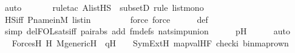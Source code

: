 \begin{isabellebody}
\ auto{\isacharbrackleft}{\kern0pt}{}{\isacharbrackright}{\kern0pt}\isanewline
\ \ \ \ \ \ \isamarkupfalse%
{\isacharparenleft}{\kern0pt}rule{\isacharunderscore}{\kern0pt}tac\ A{\isacharequal}{\kern0pt}{\isachardoublequoteopen}list{\isacharparenleft}{\kern0pt}HS{\isacharparenright}{\kern0pt}{\isachardoublequoteclose}\ \ subsetD{\isacharcomma}{\kern0pt}\ rule\ list{\isacharunderscore}{\kern0pt}mono{\isacharparenright}{\kern0pt}\isanewline
\ \ \ \ \isamarkupfalse%
\ HS{\isacharunderscore}{\kern0pt}iff\ P{\isacharunderscore}{\kern0pt}name{\isacharunderscore}{\kern0pt}in{\isacharunderscore}{\kern0pt}M\ listin{\isacharprime}{\kern0pt}{\isacharprime}{\kern0pt}\isanewline
\ \ \ \ \ \ \ \isamarkupfalse%
\ {\isacharparenleft}{\kern0pt}force{\isacharcomma}{\kern0pt}\ force{\isacharparenright}{\kern0pt}\isanewline
\ \ \ \ \isamarkupfalse%
\ {\isasymphi}{\isacharunderscore}{\kern0pt}def\isanewline
\ \ \ \ \ \isamarkupfalse%
\ {\isacharparenleft}{\kern0pt}simp\ del{\isacharcolon}{\kern0pt}FOL{\isacharunderscore}{\kern0pt}sats{\isacharunderscore}{\kern0pt}iff\ pair{\isacharunderscore}{\kern0pt}abs\ add{\isacharcolon}{\kern0pt}\ fm{\isacharunderscore}{\kern0pt}defs\ nat{\isacharunderscore}{\kern0pt}simp{\isacharunderscore}{\kern0pt}union{\isacharparenright}{\kern0pt}\isanewline
\ \ \ \ \isamarkupfalse%
\ pH\isanewline
\ \ \ \ \isamarkupfalse%
\ auto\isanewline
\ \ \isamarkupfalse%
\ \isamarkupfalse%
\ ForcesH{}{\isacharcolon}{\kern0pt}\ {\isachardoublequoteopen}{\isacharparenleft}{\kern0pt}{\isasymforall}H{\isachardot}{\kern0pt}\ M{\isacharunderscore}{\kern0pt}generic{\isacharparenleft}{\kern0pt}H{\isacharparenright}{\kern0pt}\ {\isasymand}\ q{\isasymin}H\ \ {\isasymlongrightarrow}\ \ SymExt{\isacharparenleft}{\kern0pt}H{\isacharparenright}{\kern0pt}{\isacharcomma}{\kern0pt}\ map{\isacharparenleft}{\kern0pt}val{\isacharparenleft}{\kern0pt}H{\isacharparenright}{\kern0pt}{\isacharcomma}{\kern0pt}{\isacharbrackleft}{\kern0pt}F{\isacharprime}{\kern0pt}{\isacharcomma}{\kern0pt}\ check{\isacharparenleft}{\kern0pt}i{\isacharparenright}{\kern0pt}{\isacharcomma}{\kern0pt}\ binmap{\isacharunderscore}{\kern0pt}row{\isacharprime}{\kern0pt}{\isacharparenleft}{\kern0pt}n{\isacharparenright}{\kern0pt}{\isacharbrackright}{\kern0pt}{\isacharparenright}{\kern0pt}\ {\isasymTurnstile}\ {\isasymphi}{\isacharparenright}{\kern0pt}{\isachardoublequoteclose}\isanewline
\ \ \ \ \isamarkupfalse%

\end{isabellebody}
